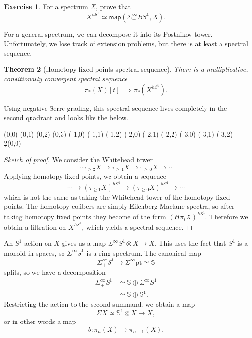 \documentclass[10pt, oneside]{memoir}
\newtheorem{thm}{Theorem}[subsection]
\theoremstyle{definition}
\newtheorem{exer}[thm]{Exercise}
\theoremstyle{remark}
\theoremstyle{plain}
\theoremstyle{definition}
\theoremstyle{remark}
\newcommand{\bS}{\mathbb{S}}
\newcommand{\mr}[1]{\mathrm{#1}}
\newcommand{\ms}[1]{\mathsf{#1}}
\newcommand{\1}{\mathbf{1}}
\newcommand{\2}{\mathbf{2}}
\newcommand{\3}{\mathbf{3}}
\begin{document}
\begin{exer}
    For a spectrum $X$, prove that
    \[ X^{hS^1} \simeq \ms{map}(\Sigma_+^{\infty} BS^1, X). \]
\end{exer}

For a general spectrum, we can decompose it into its Postnikov tower. Unfortunately, we lose track of extension problems, but there is at least a spectral sequence.

\begin{thm}[Homotopy fixed points spectral sequence]
    There is a multiplicative, conditionally convergent spectral sequence
    \[ \pi_*(X)[t] \implies \pi_*(X^{hS^1}). \]
\end{thm}

Using negative Serre grading, this spectral sequence lives completely in the second quadrant and looks like the below.
\begin{center}
    \begin{sseqdata}[classes={draw=none}, name=hfp, homological Serre
        grading, xscale=1, y axis gap = 2em, axes type = frame] 
        \class["\pi_0(X)"](0,0)
        \class["\pi_1(X)"](0,1)
        \class["\pi_2(X)"](0,2)
        \class["\pi_3(X)"](0,3)
        \class["0"](-1,0)
        \class["0"](-1,1)
        \class["0"](-1,2)
        \class["\pi_0(X) \cdot t"](-2,0) 
        \class["\pi_1(X) \cdot t"](-2,1) 
        \class["\pi_2(X) \cdot t"](-2,2) 
        \class["0"](-3,0)
        \class["0"](-3,1)
        \class["0"](-3,2)
        \d2(0,0)
    \end{sseqdata} 
    \printpage[name=hfp, page=2] 
\end{center}

\begin{proof}[Sketch of proof]
    We consider the Whitehead tower
    \[ \cdots \tau_{\geq 2} X \to \tau_{\geq 1} X \to \tau_{\geq 0} X \to \cdots \]
    Applying homotopy fixed points, we obtain a sequence
    \[ \cdots \to (\tau_{\geq 1} X)^{h S^1} \to (\tau_{\geq 0} X)^{hS^1} \to \cdots \]
    which is not the same as taking the Whitehead tower of the homotopy fixed points. The homotopy cofibers are simply Eilenberg-Maclane spectra, so after taking homotopy fixed points they become of the form $(H \pi_i X)^{hS^1}$. Therefore we obtain a filtration on $X^{hS^1}$, which yields a spectral sequence.
\end{proof}

An $S^1$-action on $X$ gives us a map $\Sigma_+^{\infty} S^1 \otimes X \to X$. This uses the fact that $S^1$ is a monoid in spaces, so $\Sigma_+^{\infty} S^1$ is a ring spectrum. The canonical map
\[ \Sigma_+^{\infty} S^1 \to \Sigma_+^{\infty} \mr{pt} \simeq \bS \]
splits, so we have a decomposition
\begin{align*}
    \Sigma_+^{\infty} S^1 &\simeq \bS \oplus \Sigma^{\infty} S^1 \\
    &\simeq \bS \oplus \bS^1.
\end{align*}
Restricting the action to the second summand, we obtain a map
\[ \Sigma X \simeq \bS^1 \otimes X \to X, \]
or in other words a map
\[ b \colon \pi_n(X) \to \pi_{n+1}(X). \]
\end{document}
